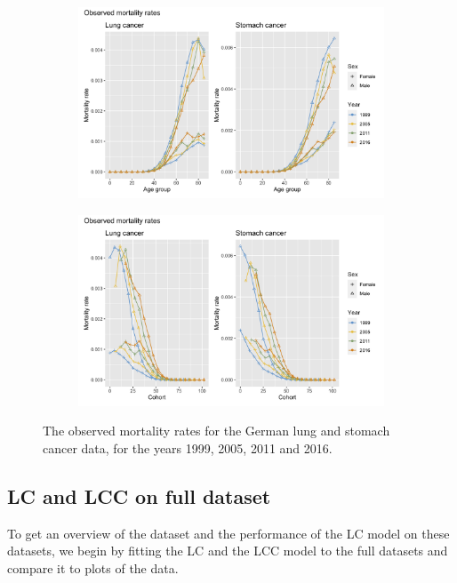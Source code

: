 \begin{figure}
    \centering
    \begin{subfigure}[b]{.45\linewidth}
        \includegraphics[width=\linewidth]{real-data/real-data-univariate/Figures/data-age-rate.png}
    \end{subfigure}
    \begin{subfigure}[b]{.45\linewidth}
        \includegraphics[width=\linewidth]{real-data/real-data-univariate/Figures/data-cohort-rate.png}
    \end{subfigure}
    \caption{The observed mortality rates for the German lung and stomach cancer data, for the years 1999, 2005, 2011 and 2016.}
    \label{fig:data-rate}
\end{figure}

\subsection{LC and LCC on full dataset}
\label{sec:LC-full-data}
To get an overview of the dataset and the performance of the LC model on these datasets, we begin by fitting the LC and the LCC model to the full datasets and compare it to plots of the data. 

